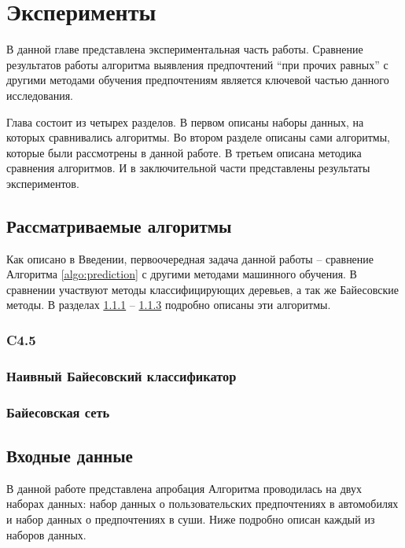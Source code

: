 \chapter{Эксперименты}
\label{chapter:experiments}
В данной главе представлена экспериментальная часть работы. Сравнение результатов работы алгоритма выявления предпочтений \enquote{при прочих равных} с другими методами обучения предпочтениям является ключевой частью данного исследования.

Глава состоит из четырех разделов. В первом описаны наборы данных, на которых сравнивались алгоритмы. Во втором разделе описаны сами алгоритмы, которые были рассмотрены в данной работе. В третьем описана методика сравнения алгоритмов. И в заключительной части представлены результаты экспериментов.

\section{Рассматриваемые алгоритмы}

Как описано в Введении, первоочередная задача данной работы – сравнение Алгоритма \ref{algo:prediction} с другими методами машинного обучения. В сравнении участвуют методы классифицирующих деревьев, а так же Байесовские методы. В разделах \ref{subsec:c4.5} -- \ref{subsec:bayes_net} подробно описаны эти алгоритмы.

	\subsection{C4.5}
	\label{subsec:c4.5}
	
	\subsection{Наивный Байесовский классификатор}
	\label{subsec:naive_bayes}
	
	\subsection{Байесовская сеть}
	\label{subsec:bayes_net}

\section{Входные данные}
	В данной работе представлена
	апробация Алгоритма проводилась на двух наборах данных: набор данных о пользовательских предпочтениях в автомобилях и набор данных о предпочтениях в суши. Ниже подробно описан каждый из наборов данных.
	
